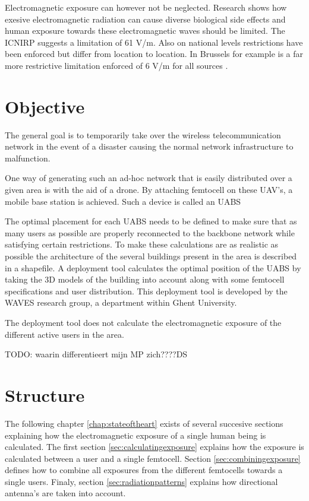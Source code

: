 Electromagnetic exposure can however not be neglected. Research shows how exesive electromagnetic radiation can cause diverse biological side effects \cite{bioeffects} and human exposure towards these electromagnetic waves should be limited. The \gls{ICNIRP} 
suggests a limitation of 61 V/m. Also on national levels restrictions have been enforced but differ from location to location. In Brussels for example is a far more restrictive limitation enforced of 6 V/m for all sources \cite{J1, J5}.
\section{Objective}
\label{sec:objective}
The general goal is to temporarily take over the wireless telecommunication network in the event of a disaster causing the normal network infrastructure to malfunction.

One way of generating such an ad-hoc network that is easily distributed over a given area is with the aid of a drone. By attaching femtocell on these UAV's, a mobile base station is achieved. Such a device is called an \gls{UABS}

The optimal placement for each \gls{UABS} needs to be defined to make sure that as many users as possible are properly reconnected to the backbone network while satisfying certain restrictions. To make these calculations are as realistic as possible the architecture of the several buildings present in the area is described in a shapefile. 
A deployment tool calculates the optimal position of the \gls{UABS} by taking the 3D models of the building into account along with some femtocell specifications and user distribution. This deployment tool is developed by the WAVES research group, a department within Ghent University.

The deployment tool does not calculate the electromagnetic exposure of the different active users in the area.

TODO: waarin differentieert mijn MP zich????DS

\section{Structure}
\label{sec:structure}

The following chapter \ref{chap:stateoftheart} exists of several succesive sections explaining how the electromagnetic exposure of a single human being is calculated. The first section \ref{sec:calculatingexposure}
explains how the exposure is calculated between a user and a single femtocell. Section \ref{sec:combiningexposure}  defines how to combine all exposures from the different femtocells towards a single users.
Finaly, section \ref{sec:radiationpatterns} explains how directional antenna's are taken into account.


